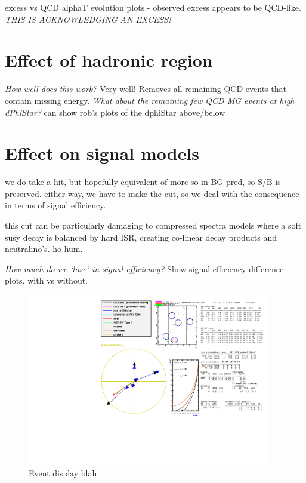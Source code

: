excess vs QCD alphaT evolution plots - observed excess appears to be QCD-like.
\emph{THIS IS ACKNOWLEDGING AN EXCESS!}

\section{Effect of hadronic region}

\emph{How well does this work?} Very well! Removes all remaining QCD events that
contain missing energy. \emph{What about the remaining few QCD MG events at high
dPhiStar?} can show rob's plots of the dphiStar above/below

\section{Effect on signal models}
we do take a hit, but hopefully equivalent of more so in BG pred, so S/B is
preserved. either way, we have to make the cut, so we deal with the consequence
in terms of signal efficiency.

this cut can be particularly damaging to compressed spectra models where a
soft susy decay is balanced by hard ISR, creating co-linear decay products and
neutralino's. ho-hum.

\emph{How much do we `lose' in signal efficiency?} Show signal efficiency
difference plots, with vs without.

\clearpage
\begin{figure}
    \centering
    \includegraphics[width=0.95\textwidth]
    {Figs/eventDisplays/Had_QCD_MG_MC_HT375_skim_displays_singleEvent.pdf}
    \caption{Event display blah}
    \label{fig:event_display_QCD}
\end{figure}
